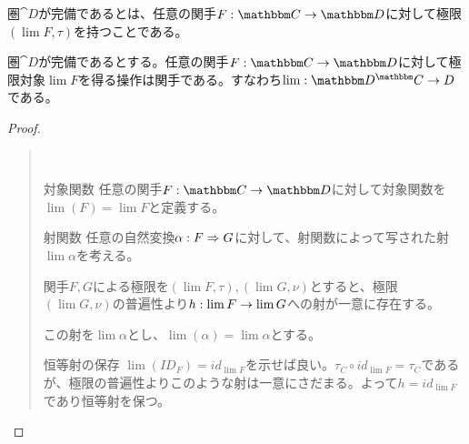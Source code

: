 \begin{define}[完備]\label{def-completeness}
  圏$\cat{D}$が完備であるとは、任意の関手$\functor{F}{C}{D}$に対して極限$(\lim F, \tau)$を持つことである。
\end{define}
\begin{prop}[極限の関手性]\label{prop-limit-is-functor}
  圏$\cat{D}$が完備であるとする。任意の関手$\functor{F}{C}{D}$に対して極限対象$\lim F$を得る操作は関手である。すなわち$\mor{\lim}{\funccat{C}{D}}{D}$である。
\end{prop}
\begin{proof}
  \begin{quote}~
    \begin{mydescription}
      \item[対象関数] 任意の関手$\functor{F}{C}{D}$に対して対象関数を$\lim(F) = \lim F$と定義する。
      \item[射関数] 
      任意の自然変換$\nat{\alpha}{F}{G}$に対して、射関数によって写された射$\lim \alpha$を考える。

      関手$F,G$による極限を$(\lim F, \tau),(\lim G, \nu)$とすると、極限$(\lim G, \nu)$の普遍性より$\mor{h}{\lim F}{\lim G}$への射が一意に存在する。
      \begin{center}
        \begin{tikzpicture}[auto]

        \end{tikzpicture}
      \end{center}
      この射を$\lim\alpha$とし、$\lim(\alpha)=\lim\alpha$とする。
      \item[恒等射の保存] $\lim(ID_F)=id_{\lim F}$を示せば良い。$\tau_C\circ id_{\lim F} = \tau_C$であるが、極限の普遍性よりこのような射は一意にさだまる。よって$h=id_{\lim F}$であり恒等射を保つ。
      \begin{center}
\end{center}
\end{mydescription}
\end{quote}
\end{proof}
